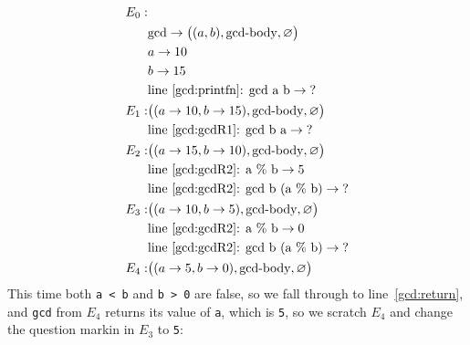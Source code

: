 \begin{align*}
  E_0:&\\
      & \text{gcd} \rightarrow \big((a, b), \text{gcd-body}, \varnothing\big)\\
      & a \rightarrow 10\\
      & b \rightarrow 15\\
      & \text{line~\ref{gcd:printfn}: gcd a b} \rightarrow \text{?}\\
  E_1:& \big((a \rightarrow 10, b \rightarrow 15), \text{gcd-body}, \varnothing\big)\\
      & \text{line~\ref{gcd:gcdR1}: gcd b a} \rightarrow \text{?}\\
  E_2:& \big((a \rightarrow 15, b \rightarrow 10), \text{gcd-body}, \varnothing\big)\\
      & \text{line~\ref{gcd:gcdR2}: a \% b} \rightarrow 5\\
      & \text{line~\ref{gcd:gcdR2}: gcd b (a \% b)} \rightarrow \text{?}\\
  E_3:& \big((a \rightarrow 10, b \rightarrow 5), \text{gcd-body}, \varnothing\big)\\
      & \text{line~\ref{gcd:gcdR2}: a \% b} \rightarrow 0\\
      & \text{line~\ref{gcd:gcdR2}: gcd b (a \% b)} \rightarrow \text{?}\\
  E_4:& \big((a \rightarrow 5, b \rightarrow 0), \text{gcd-body}, \varnothing\big)\\
\end{align*}
This time both \lstinline!a < b! and \lstinline!b > 0! are false, so we fall through to line~\ref{gcd:return}, and \lstinline!gcd! from $E_4$ returns its value of \lstinline!a!, which is \lstinline!5!, so we scratch $E_4$ and change the question markin in $E_3$ to \lstinline!5!:
